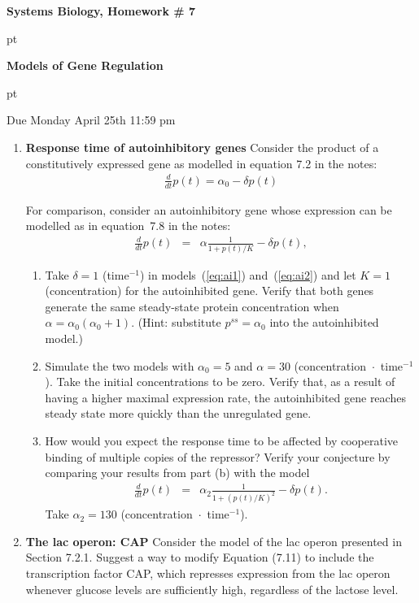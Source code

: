 \documentclass[12pt]{article}
\newcommand{\beqn}{\begin{eqnarray}}
\newcommand{\eeqn}{\end{eqnarray}}
\def \beq {\begin{eqnarray}}
\def \eeq {\end{eqnarray}}
\def \beqn {\begin{eqnarray*}}
\def \eeqn {\end{eqnarray*}}
\begin{document}
\centerline{\Large \bf Systems Biology, Homework \# 7}
 pt
\centerline{\Large \bf Models of Gene Regulation}
 pt
\centerline{\Large  Due Monday April 25th 11:59 pm}

\begin{enumerate}

\item {\bf Response time of autoinhibitory genes} Consider the product of a constitutively expressed gene as modelled in equation 7.2 in the notes:
\beq
\label{eq:ai1}
\frac{d}{dt} p(t) = \alpha_0 - \delta p(t)
\eeq

For comparison, consider an autoinhibitory gene whose expression can be modelled as in equation~7.8 in the notes:
\beq
\label{eq:ai2}
\frac{d}{dt} p(t) &=& \alpha \frac{1}{1+p(t)/K} - \delta p(t),
\eeq



\begin{enumerate}  
\item Take $\delta = 1$ (time$^{-1}$) in models~(\ref{eq:ai1}) and~(\ref{eq:ai2})  and let $K=1$ (concentration) for the autoinhibited gene.  Verify that both genes generate the same steady-state protein concentration when $\alpha=\alpha_0(\alpha_0+1)$.  (Hint: substitute $p^{ss}= \alpha_0$ into the autoinhibited model.)

\item Simulate the two models with $\alpha_0=5$ and $\alpha=30$ (concentration $\!\cdot\!$ time$^{-1}$).  Take the initial concentrations to be zero.  Verify that, as a result of having a higher maximal expression rate, the autoinhibited gene reaches steady state more quickly than the unregulated gene.

\item How would you expect the response time to be affected by cooperative binding of multiple copies of the repressor?  Verify your conjecture by comparing your results from part (b) with the model
\beqn
\frac{d}{dt} p(t) &=& \alpha_2 \frac{1}{1+(p(t)/K)^2} - \delta p(t).
\eeqn
Take $\alpha_2 =130$ (concentration $\!\cdot\!$ time$^{-1}$). 

\end{enumerate}

\item {\bf The lac operon: CAP} Consider the model of the lac operon presented in Section 7.2.1. Suggest a way to modify Equation (7.11) to include the transcription factor CAP, which represses expression from the lac operon whenever glucose levels are sufficiently high, regardless of the lactose level.


\end{enumerate}
\end{document}
